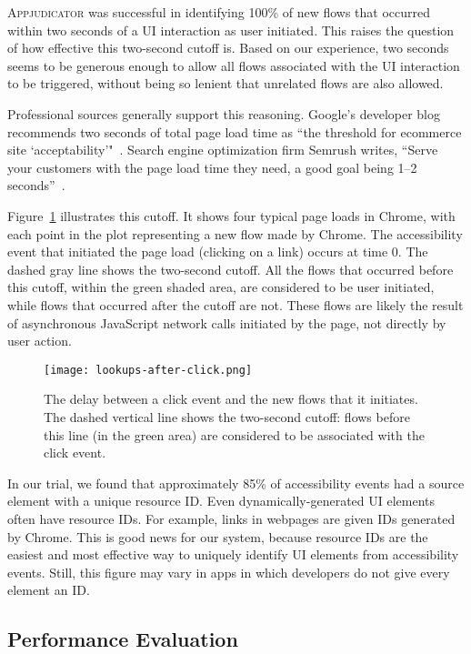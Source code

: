 \textsc{Appjudicator} was successful in identifying 100\% of new flows that
occurred within two seconds of a UI interaction as user initiated. This raises
the question of how effective this two-second cutoff is. Based on our
experience, two seconds seems to be generous enough to allow all flows
associated with the UI interaction to be triggered, without being so lenient
that unrelated flows are also allowed.

Professional sources generally support this reasoning. Google's developer blog
recommends two seconds of total page load time as ``the threshold for ecommerce
site `acceptability'"~\cite{ohye2010}. Search engine optimization firm Semrush
writes, ``Serve your customers with the page load time they need, a good goal
being 1--2 seconds''~\cite{bird2020}.

Figure~\ref{fig:lookups-after-click} illustrates this cutoff. It shows four
typical page loads in Chrome, with each point in the plot representing a new
flow made by Chrome. The accessibility event that initiated the page load
(clicking on a link) occurs at time 0. The dashed gray line shows the two-second
cutoff. All the flows that occurred before this cutoff, within the green shaded
area, are considered to be user initiated, while flows that occurred after the
cutoff are not. These flows are likely the result of asynchronous JavaScript
network calls initiated by the page, not directly by user action.

\begin{figure}[h]
    \centering
	\texttt{[image: lookups-after-click.png]}
	\caption{The delay between a click event and the new flows that it
		initiates. The dashed vertical line shows the two-second cutoff: flows
		before this line (in the green area) are considered to be associated
		with the click event.}
	\label{fig:lookups-after-click}
\end{figure}

In our trial, we found that approximately 85\% of accessibility events had a
source element with a unique resource ID. Even dynamically-generated UI elements
often have resource IDs. For example, links in webpages are given IDs generated
by Chrome. This is good news for our system, because resource IDs are the
easiest and most effective way to uniquely identify UI elements from
accessibility events. Still, this figure may vary in apps in which developers do
not give every element an ID.

\subsection{Performance Evaluation}
\label{sec:performance-evaluation}

